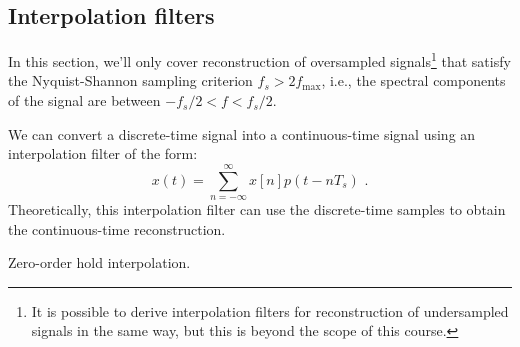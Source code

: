 \subsection{Interpolation filters}
In this section, we'll only cover reconstruction of oversampled signals\footnote{It is possible to derive interpolation filters
  for reconstruction of undersampled signals in the same way, but this is beyond the scope of this course.} that satisfy
the Nyquist-Shannon sampling criterion $f_s > 2f_{\mathrm{max}}$, i.e., 
the spectral components of the signal are between $-f_s/2 < f < f_s/2$.

We can convert a discrete-time signal into a continuous-time signal using an interpolation filter of the form:
\begin{equation}
  x(t) = \sum_{n=-\infty}^{\infty} x[n]p(t-nT_s)\,\,.
\end{equation}
Theoretically, this interpolation filter can use the discrete-time samples to obtain the continuous-time reconstruction.
\begin{marginfigure}
  \begin{center}
  \end{center}
  \caption{Zero-order hold interpolation.}
  \label{fig:z-o-hold}
\end{marginfigure}

